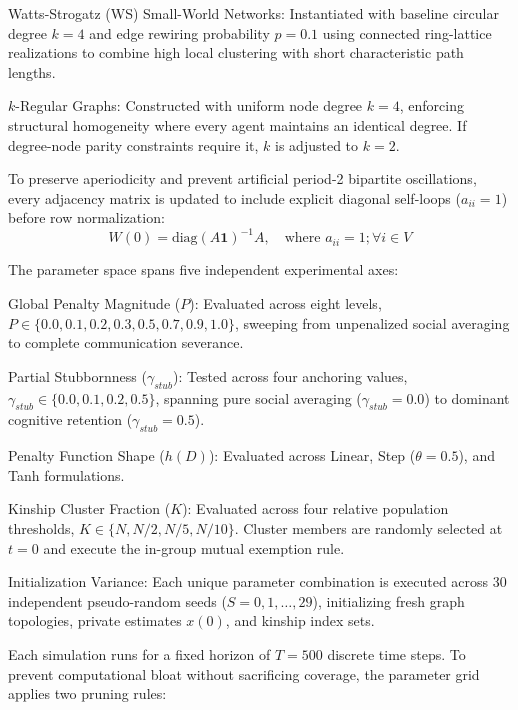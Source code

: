 Watts-Strogatz (WS) Small-World Networks: Instantiated with baseline circular degree $k = 4$ and edge rewiring probability $p = 0.1$ using connected ring-lattice realizations to combine high local clustering with short characteristic path lengths\cite{degroot1974reaching,acemoglu2013opinion}.

$k$-Regular Graphs: Constructed with uniform node degree $k = 4$, enforcing structural homogeneity where every agent maintains an identical degree\cite{degroot1974reaching,acemoglu2013opinion}. If degree-node parity constraints require it, $k$ is adjusted to $k = 2$\cite{friedkin1990social}.

To preserve aperiodicity and prevent artificial period-2 bipartite oscillations, every adjacency matrix is updated to include explicit diagonal self-loops ($a_{ii} = 1$) before row normalization\cite{acemoglu2013opinion}: $$W(0) = \text{diag}(A \mathbf{1})^{-1} A, \quad \text{where } a_{ii} = 1 ; \forall i \in V$$

The parameter space spans five independent experimental axes\cite{degroot1974reaching}:

Global Penalty Magnitude ($P$): Evaluated across eight levels, $P \in \{0.0,0.1,0.2,0.3,0.5,0.7,0.9,1.0\}$, sweeping from unpenalized social averaging to complete communication severance\cite{degroot1974reaching}.

Partial Stubbornness ($\gamma_{stub}$): Tested across four anchoring values, $\gamma_{stub} \in \{0.0,0.1,0.2,0.5\}$, spanning pure social averaging ($\gamma_{stub} = 0.0$) to dominant cognitive retention ($\gamma_{stub} = 0.5$)\cite{degroot1974reaching}.

Penalty Function Shape ($h(D)$): Evaluated across Linear, Step ($\theta = 0.5$), and Tanh formulations\cite{degroot1974reaching}.

Kinship Cluster Fraction ($K$): Evaluated across four relative population thresholds, $K \in \{N,N/2,N/5,N/10\}$\cite{degroot1974reaching}. Cluster members are randomly selected at $t = 0$ and execute the in-group mutual exemption rule\cite{friedkin1990social,acemoglu2013opinion}.

Initialization Variance: Each unique parameter combination is executed across 30 independent pseudo-random seeds ($S = {0, 1, \dots, 29}$), initializing fresh graph topologies, private estimates $x(0)$, and kinship index sets\cite{degroot1974reaching,friedkin1990social}.

Each simulation runs for a fixed horizon of $T = 500$ discrete time steps\cite{degroot1974reaching}. To prevent computational bloat without sacrificing coverage, the parameter grid applies two pruning rules\cite{acemoglu2013opinion}:

